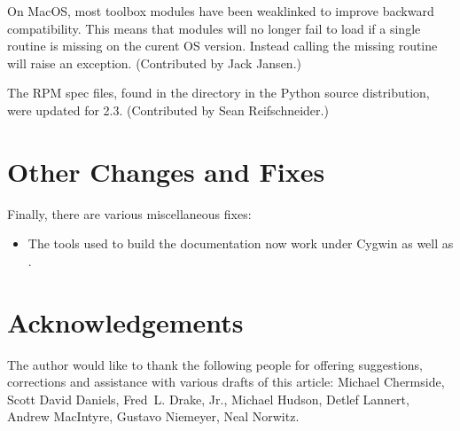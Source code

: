 \documentclass{howto}
\begin{document}
On MacOS, most toolbox modules have been weaklinked to improve
backward compatibility.  This means that modules will no longer fail
to load if a single routine is missing on the curent OS version.
Instead calling the missing routine will raise an exception.
(Contributed by Jack Jansen.)

The RPM spec files, found in the  directory in the
Python source distribution, were updated for 2.3.  (Contributed by
Sean Reifschneider.)


\section{Other Changes and Fixes}

Finally, there are various miscellaneous fixes:

\begin{itemize}

\item The tools used to build the documentation now work under Cygwin
as well as \UNIX.

\end{itemize}


\section{Acknowledgements \label{acks}}

The author would like to thank the following people for offering
suggestions, corrections and assistance with various drafts of this
article: Michael Chermside, Scott David Daniels, Fred~L. Drake, Jr.,
Michael Hudson, Detlef Lannert, Andrew MacIntyre, Gustavo Niemeyer,
Neal Norwitz.
\end{document}
